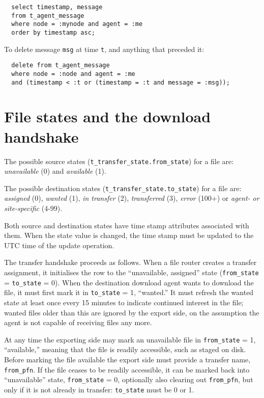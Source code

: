 \documentclass{cmspaper}
\begin{document}
{\small\begin{verbatim}
  select timestamp, message
  from t_agent_message
  where node = :mynode and agent = :me
  order by timestamp asc;
\end{verbatim}}

To delete message \texttt{msg} at time \texttt{t}, and anything that preceded it:

{\small\begin{verbatim}
  delete from t_agent_message
  where node = :node and agent = :me
  and (timestamp < :t or (timestamp = :t and message = :msg));
\end{verbatim}}


\section{File states and the download handshake}

The possible source states (\texttt{t\_transfer\_state.from\_state}) for a file are: {\em unavailable} (0) and {\em available} (1).

The possible destination states (\texttt{t\_transfer\_state.to\_state}) for a file are: {\em assigned} (0), {\em wanted} (1), {\em in transfer} (2), {\em transferred} (3), {\em error} (100+) or {\em agent- or site-specific} (4-99).

Both source and destination states have time stamp attributes associated with them.  When the state value is changed, the time stamp must be updated to the UTC time of the update operation.

The transfer handshake proceeds as follows.  When a file router creates a transfer assignment, it initialises the row to the ``unavailable, assigned'' state (\texttt{from\_state} = \texttt{to\_state} = 0).  When the destination download agent wants to download the file, it must first mark it in \texttt{to\_state} = 1, ``wanted.''  It must refresh the wanted state at least once every 15 minutes to indicate continued interest in the file; wanted files older than this are ignored by the export side, on the assumption the agent is not capable of receiving files any more.

At any time the exporting side may mark an unavailable file in \texttt{from\_state} = 1, ``available,'' meaning that the file is readily accessible, such as staged on disk.  Before marking the file available the export side must provide a transfer name, \texttt{from\_pfn}.  If the file ceases to be readily accessible, it can be marked back into ``unavailable'' state, \texttt{from\_state} = 0, optionally also clearing out \texttt{from\_pfn}, but only if it is not already in transfer: \texttt{to\_state} must be 0 or 1.
\end{document}
